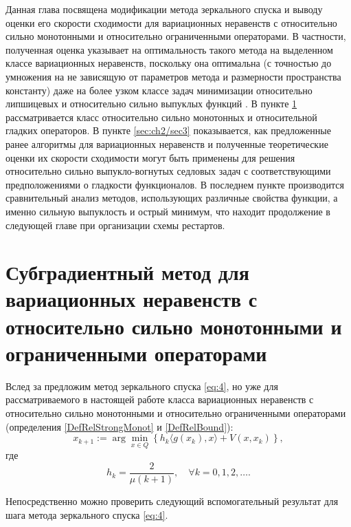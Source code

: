     Данная глава посвящена модификации метода зеркального спуска и выводу оценки его скорости сходимости для вариационных неравенств с относительно сильно монотонными и относительно ограниченными операторами. В частности, полученная оценка указывает на оптимальность такого метода на выделенном классе вариационных неравенств, поскольку она оптимальна (с точностью до умножения на не зависящую от параметров метода и размерности пространства константу) даже на более узком классе задач минимизации относительно липшицевых и относительно сильно выпуклых функций \cite{Lu_2018}. В пункте \ref{sec:ch2/sec2} рассматривается класс относительно сильно монотонных и относительной гладких операторов. В пункте \ref{sec:ch2/sec3} показывается, как предложенные ранее алгоритмы для вариационных неравенств и полученные теоретические оценки их скорости сходимости могут быть применены для решения относительно сильно выпукло-вогнутых седловых задач с соответствующими предположениями о гладкости функционалов. В последнем пункте производится сравнительный анализ методов, использующих различные свойства функции, а именно сильную выпуклость и острый минимум, что находит продолжение в следующей главе при организации схемы рестартов. 

\section{Субградиентный метод для вариационных неравенств с относительно сильно монотонными и ограниченными операторами}\label{sec:ch2/sec2}

    Вслед за \cite{Bach_2012} предложим метод зеркального спуска \eqref{eq:4}, но уже для рассматриваемого в настоящей работе класса  вариационных неравенств с относительно сильно монотонными и относительно ограниченными операторами (определения \ref{DefRelStrongMonot} и \ref{DefRelBound}):
    \begin{equation} \label{eq:4}
        x_{k+1} := \arg \min_{x \in Q} \left\{ h_k \langle g(x_k), x \rangle + V(x, x_k)\right\},
    \end{equation}
    где
    $$
        h_k = \frac{2}{\mu(k+1)},\quad  \forall k= 0,1, 2, \ldots.
    $$

    Непосредственно можно проверить следующий вспомогательный результат для шага метода зеркального спуска \eqref{eq:4}.

